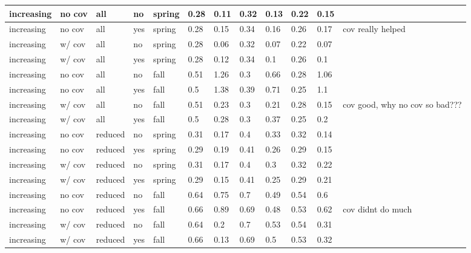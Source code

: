 \documentclass[
  12pt,
]{article}
\begin{document}
\begin{table}
\begin{tabular}[t]{l|l|l|l|l|l|l|l|l|l|l|l}
\hline
increasing & no cov & all & no & spring & 0.28 & 0.11 & 0.32 & 0.13 & 0.22 & 0.15 & \\
\hline
increasing & no cov & all & yes & spring & 0.28 & 0.15 & 0.34 & 0.16 & 0.26 & 0.17 & cov really helped\\
\hline
increasing & w/ cov & all & no & spring & 0.28 & 0.06 & 0.32 & 0.07 & 0.22 & 0.07 & \\
\hline
increasing & w/ cov & all & yes & spring & 0.28 & 0.12 & 0.34 & 0.1 & 0.26 & 0.1 & \\
\hline
increasing & no cov & all & no & fall & 0.51 & 1.26 & 0.3 & 0.66 & 0.28 & 1.06 & \\
\hline
increasing & no cov & all & yes & fall & 0.5 & 1.38 & 0.39 & 0.71 & 0.25 & 1.1 & \\
\hline
increasing & w/ cov & all & no & fall & 0.51 & 0.23 & 0.3 & 0.21 & 0.28 & 0.15 & cov good, why no cov so bad???\\
\hline
increasing & w/ cov & all & yes & fall & 0.5 & 0.28 & 0.3 & 0.37 & 0.25 & 0.2 & \\
\hline
increasing & no cov & reduced & no & spring & 0.31 & 0.17 & 0.4 & 0.33 & 0.32 & 0.14 & \\
\hline
increasing & no cov & reduced & yes & spring & 0.29 & 0.19 & 0.41 & 0.26 & 0.29 & 0.15 & \\
\hline
increasing & w/ cov & reduced & no & spring & 0.31 & 0.17 & 0.4 & 0.3 & 0.32 & 0.22 & \\
\hline
increasing & w/ cov & reduced & yes & spring & 0.29 & 0.15 & 0.41 & 0.25 & 0.29 & 0.21 & \\
\hline
increasing & no cov & reduced & no & fall & 0.64 & 0.75 & 0.7 & 0.49 & 0.54 & 0.6 & \\
\hline
increasing & no cov & reduced & yes & fall & 0.66 & 0.89 & 0.69 & 0.48 & 0.53 & 0.62 & cov didnt do much\\
\hline
increasing & w/ cov & reduced & no & fall & 0.64 & 0.2 & 0.7 & 0.53 & 0.54 & 0.31 & \\
\hline
increasing & w/ cov & reduced & yes & fall & 0.66 & 0.13 & 0.69 & 0.5 & 0.53 & 0.32 & \\
\hline
\end{tabular}
\end{table}
\end{document}
